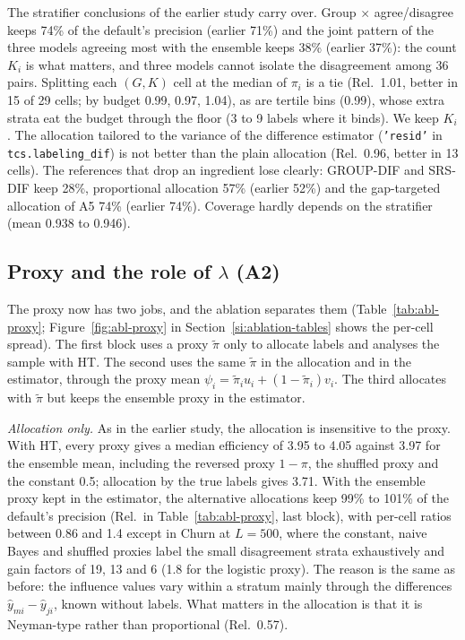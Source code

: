 \documentclass[pdflatex,sn-mathphys-num,iicol]{sn-jnl}
\theoremstyle{thmstyleone}
\theoremstyle{thmstyletwo}
\theoremstyle{thmstylethree}
\begin{document}
The stratifier conclusions of the earlier study carry over. Group $\times$ agree/disagree keeps 74\% of the default's precision (earlier 71\%) and the joint pattern of the three models agreeing most with the ensemble keeps 38\% (earlier 37\%): the count $K_i$ is what matters, and three models cannot isolate the disagreement among 36 pairs. Splitting each $(G,K)$ cell at the median of $\pi_i$ is a tie (Rel.\ 1.01, better in 15 of 29 cells; by budget 0.99, 0.97, 1.04), as are tertile bins (0.99), whose extra strata eat the budget through the floor (3 to 9 labels where it binds). We keep $K_i$. The allocation tailored to the variance of the difference estimator (\texttt{'resid'} in \texttt{tcs.labeling\_dif}) is not better than the plain allocation (Rel.\ 0.96, better in 13 cells). The references that drop an ingredient lose clearly: GROUP-DIF and SRS-DIF keep 28\%, proportional allocation 57\% (earlier 52\%) and the gap-targeted allocation of A5 74\% (earlier 74\%). Coverage hardly depends on the stratifier (mean 0.938 to 0.946).

\subsection{Proxy and the role of $\lambda$ (A2)}

The proxy now has two jobs, and the ablation separates them (Table~\ref{tab:abl-proxy}; Figure~\ref{fig:abl-proxy} in Section~\ref{si:ablation-tables} shows the per-cell spread). The first block uses a proxy $\tilde\pi$ only to allocate labels and analyses the sample with HT. The second uses the same $\tilde\pi$ in the allocation and in the estimator, through the proxy mean $\psi_i=\tilde\pi_iu_i+(1-\tilde\pi_i)v_i$. The third allocates with $\tilde\pi$ but keeps the ensemble proxy in the estimator.

\emph{Allocation only.} As in the earlier study, the allocation is insensitive to the proxy. With HT, every proxy gives a median efficiency of 3.95 to 4.05 against 3.97 for the ensemble mean, including the reversed proxy $1-\pi$, the shuffled proxy and the constant 0.5; allocation by the true labels gives 3.71. With the ensemble proxy kept in the estimator, the alternative allocations keep 99\% to 101\% of the default's precision (Rel.\ in Table~\ref{tab:abl-proxy}, last block), with per-cell ratios between 0.86 and 1.4 except in Churn at $L=500$, where the constant, naive Bayes and shuffled proxies label the small disagreement strata exhaustively and gain factors of 19, 13 and 6 (1.8 for the logistic proxy). The reason is the same as before: the influence values vary within a stratum mainly through the differences $\hat y_{mi}-\hat y_{ji}$, known without labels. What matters in the allocation is that it is Neyman-type rather than proportional (Rel.\ 0.57).
\end{document}
